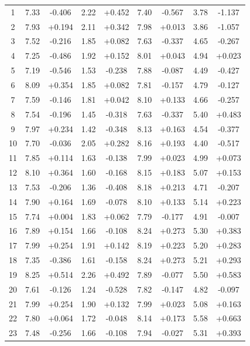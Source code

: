 \begin{table}[htbp]
\begin{tabular}{@{}c *{8}{S[table-format=+1.3]}@{}}
     & 7.33 & -0.406 & 2.22 & +0.452 & 7.40 & -0.567 & 3.78 & -1.137 \\
     2 & 7.93 & +0.194 & 2.11 & +0.342 & 7.98 & +0.013 & 3.86 & -1.057 \\
     3 & 7.52 & -0.216 & 1.85 & +0.082 & 7.63 & -0.337 & 4.65 & -0.267 \\
     4 & 7.25 & -0.486 & 1.92 & +0.152 & 8.01 & +0.043 & 4.94 & +0.023 \\
     5 & 7.19 & -0.546 & 1.53 & -0.238 & 7.88 & -0.087 & 4.49 & -0.427 \\
     6 & 8.09 & +0.354 & 1.85 & +0.082 & 7.81 & -0.157 & 4.79 & -0.127 \\
     7 & 7.59 & -0.146 & 1.81 & +0.042 & 8.10 & +0.133 & 4.66 & -0.257 \\
     8 & 7.54 & -0.196 & 1.45 & -0.318 & 7.63 & -0.337 & 5.40 & +0.483 \\
     9 & 7.97 & +0.234 & 1.42 & -0.348 & 8.13 & +0.163 & 4.54 & -0.377 \\
    10 & 7.70 & -0.036 & 2.05 & +0.282 & 8.16 & +0.193 & 4.40 & -0.517 \\
    11 & 7.85 & +0.114 & 1.63 & -0.138 & 7.99 & +0.023 & 4.99 & +0.073 \\
    12 & 8.10 & +0.364 & 1.60 & -0.168 & 8.15 & +0.183 & 5.07 & +0.153 \\
    13 & 7.53 & -0.206 & 1.36 & -0.408 & 8.18 & +0.213 & 4.71 & -0.207 \\
    14 & 7.90 & +0.164 & 1.69 & -0.078 & 8.10 & +0.133 & 5.14 & +0.223 \\
    15 & 7.74 & +0.004 & 1.83 & +0.062 & 7.79 & -0.177 & 4.91 & -0.007 \\
    16 & 7.89 & +0.154 & 1.66 & -0.108 & 8.24 & +0.273 & 5.30 & +0.383 \\
    17 & 7.99 & +0.254 & 1.91 & +0.142 & 8.19 & +0.223 & 5.20 & +0.283 \\
    18 & 7.35 & -0.386 & 1.61 & -0.158 & 8.24 & +0.273 & 5.21 & +0.293 \\
    19 & 8.25 & +0.514 & 2.26 & +0.492 & 7.89 & -0.077 & 5.50 & +0.583 \\
    20 & 7.61 & -0.126 & 1.24 & -0.528 & 7.82 & -0.147 & 4.82 & -0.097 \\
    21 & 7.99 & +0.254 & 1.90 & +0.132 & 7.99 & +0.023 & 5.08 & +0.163 \\
    22 & 7.80 & +0.064 & 1.72 & -0.048 & 8.14 & +0.173 & 5.58 & +0.663 \\
    23 & 7.48 & -0.256 & 1.66 & -0.108 & 7.94 & -0.027 & 5.31 & +0.393 \\

\end{tabular}
\end{table}
